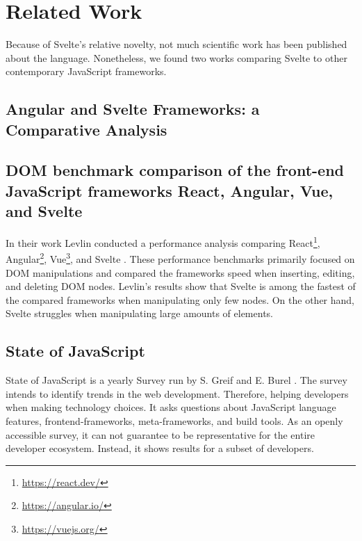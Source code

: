 \chapter{Related Work}
\label{ch:related-work}

Because of Svelte's relative novelty, not much scientific work has been published about the language. Nonetheless, we found two works comparing Svelte to other contemporary JavaScript frameworks. 

\section{Angular and Svelte Frameworks: a Comparative Analysis}


\section{DOM benchmark comparison of the front-end JavaScript frameworks React, Angular, Vue, and Svelte}
In their work Levlin conducted a performance analysis comparing React\footnote{\url{https://react.dev/}}, Angular\footnote{\url{https://angular.io/}}, Vue\footnote{\url{https://vuejs.org/}}, and Svelte \cite{levlin_dom_2020}. These performance benchmarks primarily focused on DOM manipulations and compared the frameworks speed when inserting, editing, and deleting DOM nodes. Levlin's results show that Svelte is among the fastest of the compared frameworks when manipulating only few nodes. On the other hand, Svelte struggles when manipulating large amounts of elements.    


\section{State of JavaScript}
State of JavaScript is a yearly Survey run by S. Greif and E. Burel \cite{greif_state_2022}. The survey intends to identify trends in the web development. Therefore, helping developers when making technology choices. It asks questions about JavaScript language features, frontend-frameworks, meta-frameworks, and build tools. As an openly accessible survey, it can not guarantee to be representative for the entire developer ecosystem. Instead, it shows results for a subset of developers.

